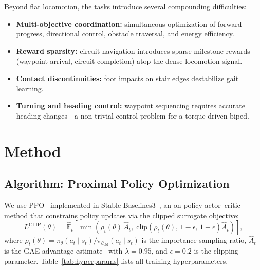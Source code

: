 \documentclass[conference]{IEEEtran}
\begin{document}
Beyond flat locomotion, the tasks introduce several compounding difficulties:
\begin{itemize}
    \item \textbf{Multi-objective coordination:} simultaneous optimization of forward progress, directional control, obstacle traversal, and energy efficiency.
    \item \textbf{Reward sparsity:} circuit navigation introduces sparse milestone rewards (waypoint arrival, circuit completion) atop the dense locomotion signal.
    \item \textbf{Contact discontinuities:} foot impacts on stair edges destabilize gait learning.
    \item \textbf{Turning and heading control:} waypoint sequencing requires accurate heading changes---a non-trivial control problem for a torque-driven biped.
\end{itemize}



\section{Method}
\label{sec:method}

\subsection{Algorithm: Proximal Policy Optimization}
\label{sec:ppo}

We use PPO~\cite{schulman2017ppo} implemented in Stable-Baselines3~\cite{raffin2021sb3}, an on-policy actor--critic method that constrains policy updates via the clipped surrogate objective:
\begin{equation}
\label{eq:ppo}
L^{\mathrm{CLIP}}(\theta) = \hat{\mathbb{E}}_t \!\left[ \min\!\left( \rho_t(\theta)\,\hat{A}_t,\; \mathrm{clip}\!\left(\rho_t(\theta),\, 1{-}\epsilon,\, 1{+}\epsilon\right)\hat{A}_t \right) \right],
\end{equation}
where $\rho_t(\theta) = \pi_\theta(a_t \mid s_t) / \pi_{\theta_{\mathrm{old}}}(a_t \mid s_t)$ is the importance-sampling ratio, $\hat{A}_t$ is the GAE advantage estimate~\cite{schulman2017ppo} with $\lambda = 0.95$, and $\epsilon = 0.2$ is the clipping parameter. Table~\ref{tab:hyperparams} lists all training hyperparameters.
\end{document}
